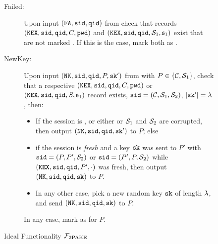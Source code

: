 \begin{figure}[tbp]
\begin{mdframed}[innertopmargin=10pt]
\begin{description}
  \item[Failed:] Upon input $(\mathtt{FA}, \mathtt{sid}, \mathtt{qid})$ from \SIM check that records $(\mathtt{KEX}, \mathtt{sid}, \mathtt{qid}, C, \mathtt{pwd})$ and $(\mathtt{KEX}, \mathtt{sid}, \mathtt{qid}, \mathcal{S}_1, \mathfrak{s}_1)$ exist that are not marked \completed. 
      If this is the case, mark both as \failed.
	
	\item[NewKey:] Upon input $(\mathtt{NK}, \mathtt{sid},\mathtt{qid}, P, \mathtt{sk}')$ from \SIM with $P\in\{\mathcal{C},\mathcal{S}_1\}$, check that a respective $(\mathtt{KEX}, \mathtt{sid}, \mathtt{qid}, C, \mathtt{pwd})$ or $(\mathtt{KEX}, \mathtt{sid}, \mathtt{qid}, S, \mathfrak{s}_1)$ record exists, $\mathtt{sid}=(\mathcal{C}, \mathcal{S}_1, \mathcal{S}_2)$, $|\mathtt{sk}'|=\lambda$, then: %
	\begin{itemize}
		\item If the session is \compromised, or either \Client or $\mathcal{S}_1$ and $\mathcal{S}_2$ are corrupted, then output $(\mathtt{NK}, \mathtt{sid},\mathtt{qid},\mathtt{sk}')$ to $P$; else
		
		\item if the session is \emph{fresh} and a key $\mathtt{sk}$ was sent to $P'$ with $\mathtt{sid}=(P, P', \mathcal{S}_2)$ or $\mathtt{sid}=(P', P, \mathcal{S}_2)$ while $(\mathtt{KEX}, \mathtt{sid}, \mathtt{qid}, P', \cdot)$ was fresh, then output $(\mathtt{NK}, \mathtt{sid}, \mathtt{qid}, \mathtt{sk})$ to $P$.
		
		\item In any other case, pick a new random key $\mathtt{sk}$ of length $\lambda$, and send $(\mathtt{NK}, \mathtt{sid}, \mathtt{qid}, \mathtt{sk})$ to $P$.
	\end{itemize}
	In any case, mark \qid as \completed for $P$.
	
\end{description}
\end{mdframed}
\caption{Ideal Functionality $\mathcal{F}_{\mathrm{2PAKE}}$}
\label{fig:2pakef}
\end{figure}

